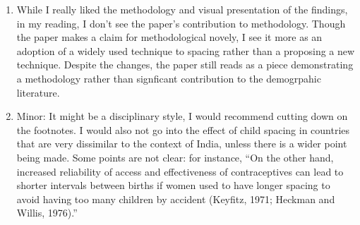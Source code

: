 \documentclass[letterpaper,12pt]{article}
\begin{document}
\begin{enumerate}
\item While I really liked the methodology and visual presentation of the
findings, in my reading, I don’t see the paper’s contribution to
methodology. Though the paper makes a claim for methodological novely, I
see it more as an adoption of a widely used technique to spacing rather
than a proposing a new technique. Despite the changes, the paper still
reads as a piece demonstrating a methodology rather than signficant
contribution to the demogrpahic literature.

\item Minor: It might be a disciplinary style, I would recommend cutting down
on the footnotes. I would also not go into the effect of child spacing
in countries that are very dissimilar to the context of India, unless
there is a wider point being made. Some points are not clear: for
instance, “On the other hand, increased reliability of access and
effectiveness of contraceptives can lead to shorter intervals between
births if women used to have longer spacing to avoid having too many
children by accident (Keyfitz, 1971; Heckman and Willis, 1976).”

\end{enumerate}


\newpage


\end{document}

